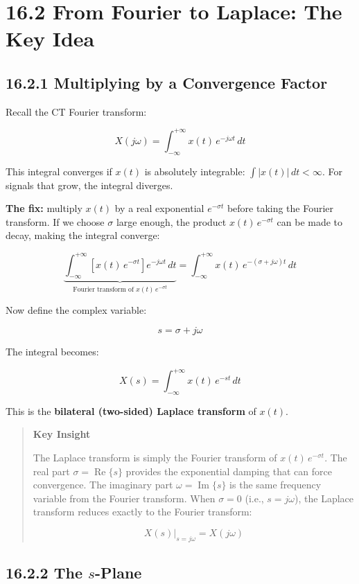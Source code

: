 \documentclass[11pt]{article}
\begin{document}
\section*{16.2 From Fourier to Laplace: The Key Idea}

\subsection*{16.2.1 Multiplying by a Convergence Factor}

Recall the CT Fourier transform:

\[X(j\omega) = \int_{-\infty}^{+\infty} x(t)\,e^{-j\omega t}\,dt\]

This integral converges if $x(t)$ is absolutely integrable: $\int |x(t)|\,dt < \infty$. For signals that grow, the integral diverges.

\textbf{The fix:} multiply $x(t)$ by a real exponential $e^{-\sigma t}$ before taking the Fourier transform. If we choose $\sigma$ large enough, the product $x(t)\,e^{-\sigma t}$ can be made to decay, making the integral converge:

\[\underbrace{\int_{-\infty}^{+\infty} \left[x(t)\,e^{-\sigma t}\right] e^{-j\omega t}\,dt}_{\text{Fourier transform of }x(t)\,e^{-\sigma t}} = \int_{-\infty}^{+\infty} x(t)\,e^{-(\sigma + j\omega)t}\,dt\]

Now define the complex variable:

\[\boxed{\,s = \sigma + j\omega\,}\]

The integral becomes:

\[\boxed{\,X(s) = \int_{-\infty}^{+\infty} x(t)\,e^{-st}\,dt\,}\]

This is the \textbf{bilateral (two-sided) Laplace transform} of $x(t)$.

\begin{quote}
\textbf{Key Insight}

The Laplace transform is simply the Fourier transform of $x(t)\,e^{-\sigma t}$. The real part $\sigma = \operatorname{Re}\{s\}$ provides the exponential damping that can force convergence. The imaginary part $\omega = \operatorname{Im}\{s\}$ is the same frequency variable from the Fourier transform. When $\sigma = 0$ (i.e., $s = j\omega$), the Laplace transform reduces exactly to the Fourier transform:

\[X(s)\big|_{s=j\omega} = X(j\omega)\]
\end{quote}

\subsection*{16.2.2 The $s$-Plane}
\end{document}
